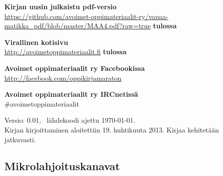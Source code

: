 \textbf{Kirjan uusin julkaistu pdf-versio} \\
\url{https://github.com/avoimet-oppimateriaalit-ry/vapaa-matikka_pdf/blob/master/MAA4.pdf?raw=true} \textbf{tulossa}

\textbf{Virallinen kotisivu} \\
\url{http://avoimetoppimateriaalit.fi} \textbf{tulossa}

\textbf{Avoimet oppimateriaalit ry Facebookissa} \\
\url{http://facebook.com/oppikirjamaraton}

\textbf{Avoimet oppimateriaalit ry IRCnetissä} \\
\#avoimetoppimateriaalit

Versio: 0.01, \, lähdekoodi ajettu \today. \\
Kirjan kirjoittaminen aloitettiin 19. huhtikuuta 2013. Kirjaa kehitetään jatkuvasti.

\subsection*{Mikrolahjoituskanavat}



